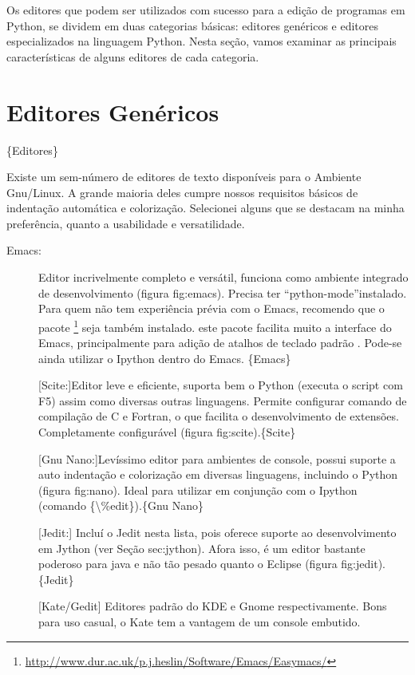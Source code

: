 \documentclass[a4paper,10pt,portuguese]{sphinxmanual}
\begin{document}
Os editores que podem ser utilizados com sucesso para a edição de
programas em Python, se dividem em duas categorias básicas:
editores genéricos e editores especializados na linguagem Python.
Nesta seção, vamos examinar as principais características de alguns
editores de cada categoria.


\chapter{Editores Genéricos}
\label{capferr::doc}\label{capferr:editores-genericos}
\{Editores\}

Existe um sem-número de editores de texto disponíveis para o
Ambiente Gnu/Linux. A grande maioria deles cumpre nossos requisitos
básicos de indentação automática e colorização. Selecionei alguns
que se destacam na minha preferência, quanto a usabilidade e
versatilidade.
\begin{description}
\item[{Emacs:}] \leavevmode
Editor incrivelmente completo e versátil, funciona como ambiente
integrado de desenvolvimento (figura fig:emacs). Precisa ter
``python-mode''instalado. Para quem não tem experiência prévia com o
Emacs, recomendo que o pacote  \footnote{
\href{http://www.dur.ac.uk/p.j.heslin/Software/Emacs/Easymacs/}{http://www.dur.ac.uk/p.j.heslin/Software/Emacs/Easymacs/}
} seja também
instalado. este pacote facilita muito a interface do Emacs,
principalmente para adição de atalhos de teclado padrão .
Pode-se ainda utilizar o Ipython dentro do Emacs. \{Emacs\}

{[}Scite:{]}Editor leve e eficiente, suporta bem o Python (executa o
script com F5) assim como diversas outras linguagens. Permite
configurar comando de compilação de C e Fortran, o que facilita o
desenvolvimento de extensões. Completamente configurável (figura
fig:scite).\{Scite\}

{[}Gnu Nano:{]}Levíssimo editor para ambientes de console, possui
suporte a auto indentação e colorização em diversas linguagens,
incluindo o Python (figura fig:nano). Ideal para utilizar em
conjunção com o Ipython (comando \{\textbackslash{}\%edit\}).\{Gnu Nano\}

{[}Jedit:{]} Incluí o Jedit nesta lista, pois oferece suporte ao
desenvolvimento em Jython (ver Seção sec:jython). Afora isso, é um
editor bastante poderoso para java e não tão pesado quanto o
Eclipse (figura fig:jedit).\{Jedit\}

{[}Kate/Gedit{]} Editores padrão do KDE e Gnome respectivamente. Bons
para uso casual, o Kate tem a vantagem de um console embutido.

\end{description}
\end{document}
